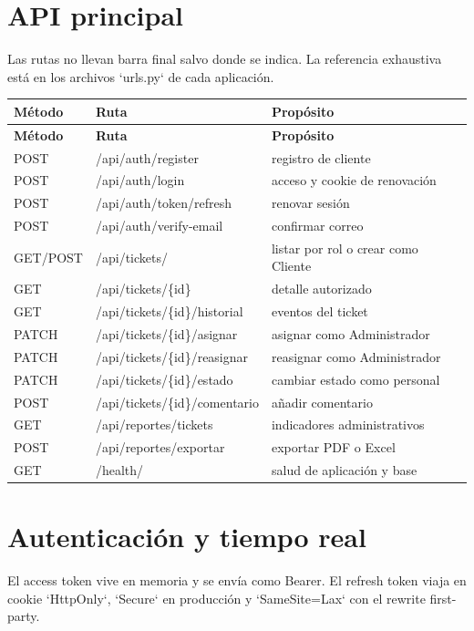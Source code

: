 \section{API principal}

Las rutas no llevan barra final salvo donde se indica. La referencia exhaustiva está en los archivos
`urls.py` de cada aplicación.

\begin{longtable}{@{}L{0.16\textwidth}L{0.43\textwidth}L{0.31\textwidth}@{}}
\toprule
\textbf{Método} & \textbf{Ruta} & \textbf{Propósito}\\
\midrule
\endfirsthead
\toprule
\textbf{Método} & \textbf{Ruta} & \textbf{Propósito}\\
\midrule
\endhead
POST & /api/auth/register & registro de cliente\\
POST & /api/auth/login & acceso y cookie de renovación\\
POST & /api/auth/token/refresh & renovar sesión\\
POST & /api/auth/verify-email & confirmar correo\\
GET/POST & /api/tickets/ & listar por rol o crear como Cliente\\
GET & /api/tickets/\{id\} & detalle autorizado\\
GET & /api/tickets/\{id\}/historial & eventos del ticket\\
PATCH & /api/tickets/\{id\}/asignar & asignar como Administrador\\
PATCH & /api/tickets/\{id\}/reasignar & reasignar como Administrador\\
PATCH & /api/tickets/\{id\}/estado & cambiar estado como personal\\
POST & /api/tickets/\{id\}/comentario & añadir comentario\\
GET & /api/reportes/tickets & indicadores administrativos\\
POST & /api/reportes/exportar & exportar PDF o Excel\\
GET & /health/ & salud de aplicación y base\\
\bottomrule
\end{longtable}

\section{Autenticación y tiempo real}

El access token vive en memoria y se envía como Bearer. El refresh token viaja en cookie
`HttpOnly`, `Secure` en producción y `SameSite=Lax` con el rewrite first-party.

